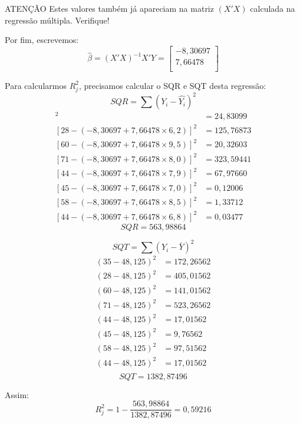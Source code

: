 \documentclass[]{ufpe-exercises}
\begin{document}
\begin{questions}
\begin{parts}
\begin{solution}
			\begin{myalert}{ATENÇÃO}
				Estes valores também já apareciam na matriz \((X'X)\) calculada na regressão múltipla. Verifique!
			\end{myalert}

			Por fim, escrevemos:
			\[
				\hat{\beta} = (X'X)^{-1}X'Y =
				\begin{bmatrix}
					-8,30697 \\
					7,66478  \\
				\end{bmatrix}
			\]

			Para calcularmos \(R^{2}_{j}\), precisamos calcular o SQR e SQT desta regressão:
			\[ SQR = \sum (Y_{i} - \hat{Y_{i}})^{2} \]
			\begin{align*}
				[35 - (-8,30697 + 7,66478 \times 5,0)]^{2} & = 24,83099  \\
				[28 - (-8,30697 + 7,66478 \times 6,2)]^{2} & = 125,76873 \\
				[60 - (-8,30697 + 7,66478 \times 9,5)]^{2} & = 20,32603  \\
				[71 - (-8,30697 + 7,66478 \times 8,0)]^{2} & = 323,59441 \\
				[44 - (-8,30697 + 7,66478 \times 7,9)]^{2} & = 67,97660  \\
				[45 - (-8,30697 + 7,66478 \times 7,0)]^{2} & = 0,12006   \\
				[58 - (-8,30697 + 7,66478 \times 8,5)]^{2} & = 1,33712   \\
				[44 - (-8,30697 + 7,66478 \times 6,8)]^{2} & = 0,03477
			\end{align*}
			\[ SQR = 563,98864\]

			\[ SQT = \sum (Y_{i} - \bar{Y})^{2}\]
			\begin{align*}
				(35 - 48,125)^{2} & = 172,26562 \\
				(28 - 48,125)^{2} & = 405,01562 \\
				(60 - 48,125)^{2} & = 141,01562 \\
				(71 - 48,125)^{2} & = 523,26562 \\
				(44 - 48,125)^{2} & = 17,01562  \\
				(45 - 48,125)^{2} & = 9,76562   \\
				(58 - 48,125)^{2} & = 97,51562  \\
				(44 - 48,125)^{2} & = 17,01562  \\
			\end{align*}
			\[ SQT = 1382,87496\]

			Assim:
			\[ R^{2}_{j} = 1 - \frac{563,98864}{1382,87496} = 0,59216\]


\end{solution}
\end{parts}
\end{questions}
\end{document}
